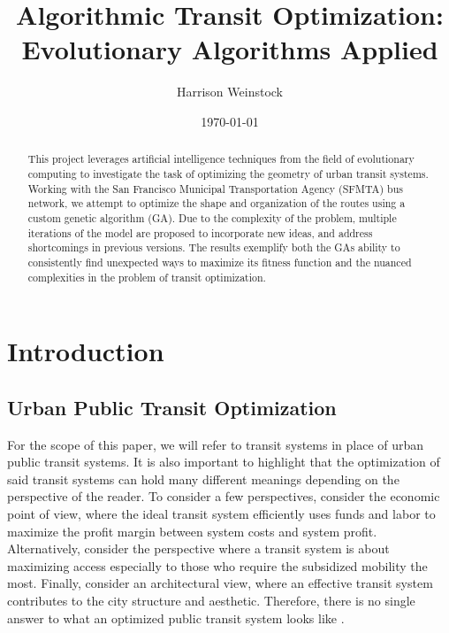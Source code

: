 \documentclass[11pt]{amsart}
\title{Algorithmic Transit Optimization: Evolutionary Algorithms Applied} %
\author{Harrison Weinstock}
\date{\today} %
\theoremstyle{definition}                  %
\theoremstyle{remark}                       %
\numberwithin{equation}{section}
\begin{document}
\begin{abstract} %
This project leverages artificial intelligence techniques from the field of evolutionary computing to investigate the task of optimizing the geometry of urban transit systems. Working with the San Francisco Municipal Transportation Agency (SFMTA) bus network, we attempt to optimize the shape and organization of the routes using a custom genetic algorithm (GA). Due to the complexity of the problem, multiple iterations of the model are proposed to incorporate new ideas, and address shortcomings in previous versions. The results exemplify both the GAs ability to consistently find unexpected ways to maximize its fitness function and the nuanced complexities in the problem of transit optimization. 
\end{abstract}

\maketitle %


\tableofcontents %

\section{Introduction}

\subsection{Urban Public Transit Optimization}
    For the scope of this paper, we will refer to transit systems in place of urban public transit systems. It is also important to highlight that the optimization of said transit systems can hold many different meanings depending on the perspective of the reader. To consider a few perspectives, consider the economic point of view, where the ideal transit system efficiently uses funds and labor to maximize the profit margin between system costs and system profit. Alternatively, consider the perspective where a transit system is about maximizing access especially to those who require the subsidized mobility the most. Finally, consider an architectural view, where an effective transit system contributes to the city structure and aesthetic. Therefore, there is no single answer to what an optimized public transit system looks like \cite{walker2012, litman2011}.
\end{document}
